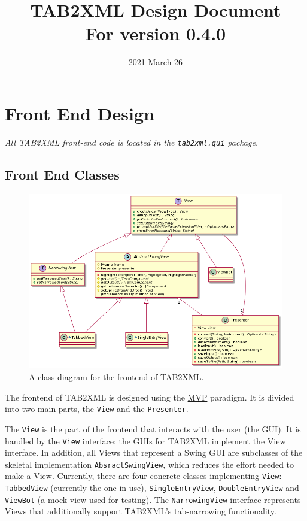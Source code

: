 \documentclass[11pt]{article}
\date{2021 March 26}
\title{TAB2XML Design Document\\\medskip
\large For version 0.4.0}
\begin{document}
\maketitle
\tableofcontents

\newpage

\section{Front End Design}
\label{sec:org92afa69}
\emph{All TAB2XML front-end code is located in the \texttt{tab2xml.gui} package.}
\subsection{Front End Classes}
\label{sec:org4cb4296}
\begin{figure}[htbp]
\centering
\includegraphics[width=.9\linewidth]{./Diagrams/frontend-class-diagram.png}
\caption{A class diagram for the frontend of TAB2XML.}
\end{figure}

The frontend of TAB2XML is designed using the \href{https://en.wikipedia.org/wiki/Model\%E2\%80\%93view\%E2\%80\%93presenter}{MVP} paradigm.  It is divided into two main parts, the \texttt{View} and the \texttt{Presenter}.

The \texttt{View} is the part of the frontend that interacts with the user (the GUI).  It is handled by the \texttt{View} interface; the GUIs for TAB2XML implement the View interface.  In addition, all Views that represent a Swing GUI are subclasses of the skeletal implementation \texttt{AbsractSwingView}, which reduces the effort needed to make a View.  Currently, there are four concrete classes implementing \texttt{View}: \texttt{TabbedView} (currently the one in use), \texttt{SingleEntryView}, \texttt{DoubleEntryView} and \texttt{ViewBot} (a mock view used for testing).  The \texttt{NarrowingView} interface represents Views that additionally support TAB2XML's tab-narrowing functionality.
\end{document}
